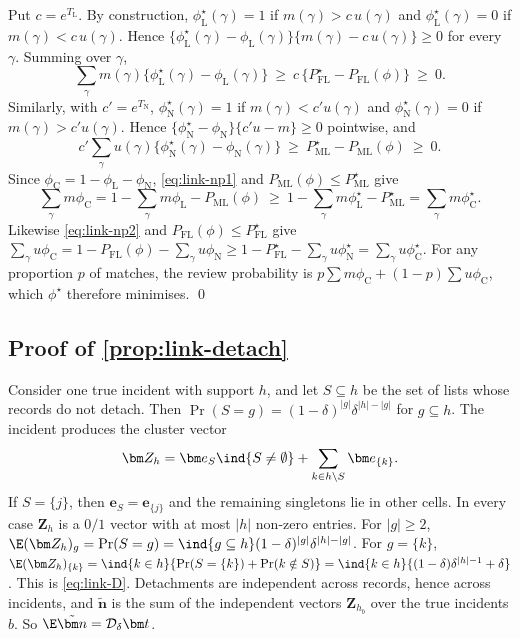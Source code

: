 Put $c=e^{T_{\mathrm L}}$. By construction, $\phi^\star_{\mathrm L}(\gamma)=1$ if $m(\gamma)>c\,u(\gamma)$ and $\phi^\star_{\mathrm L}(\gamma)=0$ if $m(\gamma)<c\,u(\gamma)$. Hence $\{\phi^\star_{\mathrm L}(\gamma)-\phi_{\mathrm L}(\gamma)\}\{m(\gamma)-c\,u(\gamma)\}\ge0$ for every $\gamma$. Summing over $\gamma$,
\begin{equation}\label{eq:link-np1}
  \sum_\gamma m(\gamma)\{\phi^\star_{\mathrm L}(\gamma)-\phi_{\mathrm L}(\gamma)\}\ \ge\ c\,\{P_{\mathrm{FL}}^\star-P_{\mathrm{FL}}(\phi)\}\ \ge\ 0 .
\end{equation}
Similarly, with $c'=e^{T_{\mathrm N}}$, $\phi^\star_{\mathrm N}(\gamma)=1$ if $m(\gamma)<c'u(\gamma)$ and $\phi^\star_{\mathrm N}(\gamma)=0$ if $m(\gamma)>c'u(\gamma)$. Hence $\{\phi^\star_{\mathrm N}-\phi_{\mathrm N}\}\{c'u-m\}\ge0$ pointwise, and
\begin{equation}\label{eq:link-np2}
  c'\sum_\gamma u(\gamma)\{\phi^\star_{\mathrm N}(\gamma)-\phi_{\mathrm N}(\gamma)\}\ \ge\ P_{\mathrm{ML}}^\star-P_{\mathrm{ML}}(\phi)\ \ge\ 0 .
\end{equation}
Since $\phi_{\mathrm C}=1-\phi_{\mathrm L}-\phi_{\mathrm N}$, \eqref{eq:link-np1} and $P_{\mathrm{ML}}(\phi)\le P_{\mathrm{ML}}^\star$ give
\[
  \textstyle\sum_\gamma m\phi_{\mathrm C}=1-\sum_\gamma m\phi_{\mathrm L}-P_{\mathrm{ML}}(\phi)\ \ge\ 1-\sum_\gamma m\phi^\star_{\mathrm L}-P_{\mathrm{ML}}^\star=\sum_\gamma m\phi^\star_{\mathrm C}.
\]
Likewise \eqref{eq:link-np2} and $P_{\mathrm{FL}}(\phi)\le P_{\mathrm{FL}}^\star$ give $\sum_\gamma u\phi_{\mathrm C}=1-P_{\mathrm{FL}}(\phi)-\sum_\gamma u\phi_{\mathrm N}\ge1-P_{\mathrm{FL}}^\star-\sum_\gamma u\phi^\star_{\mathrm N}=\sum_\gamma u\phi^\star_{\mathrm C}$. For any proportion $p$ of matches, the review probability is $p\sum m\phi_{\mathrm C}+(1-p)\sum u\phi_{\mathrm C}$, which $\phi^\star$ therefore minimises. \qed

\subsection{Proof of \texorpdfstring{\cref{prop:link-detach}}{the detachment proposition}}\label{app:link-detach}

Consider one true incident with support $h$, and let $S\subseteq h$ be the set of lists whose records do not detach. Then $\Pr(S=g)=(1-\delta)^{|g|}\delta^{|h|-|g|}$ for $g\subseteq h$. The incident produces the cluster vector
\[
  \bm Z_h=\bm e_S\ind{S\ne\emptyset}+\sum_{k\in h\setminus S}\bm e_{\{k\}} .
\]
If $S=\{j\}$, then $\bm e_S=\bm e_{\{j\}}$ and the remaining singletons lie in other cells. In every case $\bm Z_h$ is a $0/1$ vector with at most $|h|$ non-zero entries. For $|g|\ge2$, $\E(\bm Z_h)_g=\Pr(S=g)=\ind{g\subseteq h}(1-\delta)^{|g|}\delta^{|h|-|g|}$. For $g=\{k\}$, $\E(\bm Z_h)_{\{k\}}=\ind{k\in h}\{\Pr(S=\{k\})+\Pr(k\notin S)\}=\ind{k\in h}\{(1-\delta)\delta^{|h|-1}+\delta\}$. This is \eqref{eq:link-D}. Detachments are independent across records, hence across incidents, and $\tilde{\bm n}$ is the sum of the independent vectors $\bm Z_{h_b}$ over the true incidents $b$. So $\E\tilde{\bm n}=\mathcal D_\delta\bm t$.

